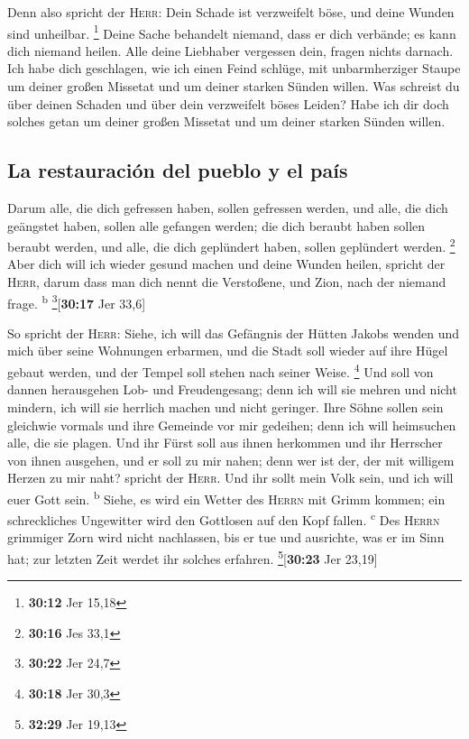  Denn also spricht der \textsc{Herr}: Dein Schade ist
verzweifelt böse, und deine Wunden sind unheilbar. \footnote{\textbf{30:12}
  Jer 15,18}  Deine Sache behandelt niemand, dass er dich
verbände; es kann dich niemand heilen.  Alle deine
Liebhaber vergessen dein, fragen nichts darnach. Ich habe dich
geschlagen, wie ich einen Feind schlüge, mit unbarmherziger Staupe um
deiner großen Missetat und um deiner starken Sünden willen.
 Was schreist du über deinen Schaden und über dein
verzweifelt böses Leiden? Habe ich dir doch solches getan um deiner
großen Missetat und um deiner starken Sünden willen.

\hypertarget{la-restauraciuxf3n-del-pueblo-y-el-pauxeds}{%
\subsection{La restauración del pueblo y el
país}\label{la-restauraciuxf3n-del-pueblo-y-el-pauxeds}}

 Darum alle, die dich gefressen haben, sollen gefressen
werden, und alle, die dich geängstet haben, sollen alle gefangen werden;
die dich beraubt haben sollen beraubt werden, und alle, die dich
geplündert haben, sollen geplündert werden. \footnote{\textbf{30:16} Jes
  33,1}  Aber dich will ich wieder gesund machen und
deine Wunden heilen, spricht der \textsc{Herr}, darum dass man dich
nennt die Verstoßene, und Zion, nach der niemand frage.
\textsuperscript{b} \footnote{\textbf{30:22} Jer 24,7}{[}\textbf{30:17}
Jer 33,6{]}

 So spricht der \textsc{Herr}: Siehe, ich will das
Gefängnis der Hütten Jakobs wenden und mich über seine Wohnungen
erbarmen, und die Stadt soll wieder auf ihre Hügel gebaut werden, und
der Tempel soll stehen nach seiner Weise. \footnote{\textbf{30:18} Jer
  30,3}  Und soll von dannen herausgehen Lob- und
Freudengesang; denn ich will sie mehren und nicht mindern, ich will sie
herrlich machen und nicht geringer.  Ihre Söhne sollen
sein gleichwie vormals und ihre Gemeinde vor mir gedeihen; denn ich will
heimsuchen alle, die sie plagen.  Und ihr Fürst soll aus
ihnen herkommen und ihr Herrscher von ihnen ausgehen, und er soll zu mir
nahen; denn wer ist der, der mit willigem Herzen zu mir naht? spricht
der \textsc{Herr}.  Und ihr sollt mein Volk sein, und ich
will euer Gott sein. \textsuperscript{b}  Siehe, es wird
ein Wetter des \textsc{Herrn} mit Grimm kommen; ein schreckliches
Ungewitter wird den Gottlosen auf den Kopf fallen. \textsuperscript{c}
 Des \textsc{Herrn} grimmiger Zorn wird nicht nachlassen,
bis er tue und ausrichte, was er im Sinn hat; zur letzten Zeit werdet
ihr solches erfahren. \footnote{\textbf{32:29} Jer 19,13}{[}\textbf{30:23}
Jer 23,19{]}

